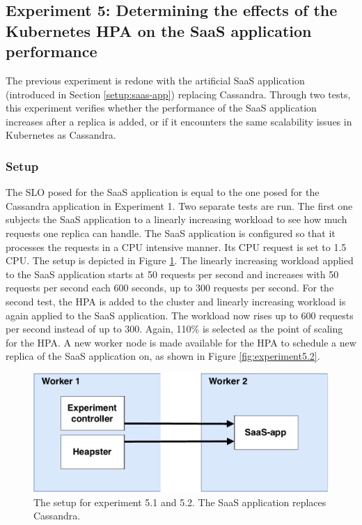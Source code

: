 \subsection{Experiment 5: Determining the effects of the Kubernetes HPA on the SaaS application performance}
The previous experiment is redone with the artificial SaaS application (introduced in Section \ref{setup:saas-app}) replacing Cassandra. Through two tests, this experiment verifies whether the performance of the SaaS application increases after a replica is added, or if it encounters the same scalability issues in Kubernetes as Cassandra.  

\subsubsection{Setup}
The SLO posed for the SaaS application is equal to the one posed for the Cassandra application in Experiment 1. Two separate tests are run. The first one subjects the SaaS application to a linearly increasing workload to see how much requests one replica can handle. The SaaS application is configured so that it processes the requests in a CPU intensive manner. Its CPU request is set to 1.5 CPU. The setup is depicted in Figure \ref{fig:experiment5.1}. The linearly increasing workload applied to the SaaS application starts at 50 requests per second and increases with 50 requests per second each 600 seconds, up to 300 requests per second. For the second test, the HPA is added to the cluster and linearly increasing workload is again applied to the SaaS application. The workload now rises up to 600 requests per second instead of up to 300. Again, 110\% is selected as the point of scaling for the HPA. A new worker node is made available for the HPA to schedule a new replica of the SaaS application on, as shown in Figure \ref{fig:experiment5.2}. 

\begin{figure}
\centering
\includegraphics[width=0.55\columnwidth]{Images/Experiments/Experiment_1_SaaS.pdf}
\caption{The setup for experiment 5.1 and 5.2. The SaaS application replaces Cassandra.}
\label{fig:experiment5.1}
\end{figure}

